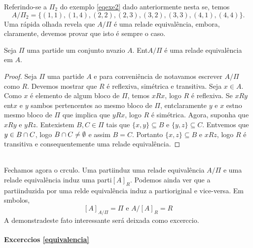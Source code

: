 Referindo-se a $\Pi_2$ do exemplo \ref{eqexe2} dado anteriormente nesta se\caoi, temos
\[
A/\Pi_2=\{(1,1),(1,4),(2,2),(2,3),(3,2),(3,3),(4,1),(4,4)\}.
\]
Uma r\'apida olhada revela que $A/\Pi$ \'e uma rela\cao de equival\^encia, embora, claramente, devemos provar que isto \'e sempre o caso.
\begin{teob}
Seja $\Pi$ uma parti\cao de um conjunto n\ao vazio $A$. Ent\ao $A/\Pi$ \'e uma rela\cao de equival\^encia em $A$.
\end{teob}
\begin{proof}
Seja $\Pi$ uma parti\cao de $A$ e para conveni\^encia de nota\cao vamos escrever $A/\Pi$ como $R$. Devemos mostrar que $R$ \'e reflexiva, sim\'etrica e transitiva. Seja $x\in A$. Como $x$ \'e elemento de algum bloco de $\Pi$, temos $xRx$, logo $R$ \'e reflexiva. Se $xRy$ ent\ao $x$ e $y$ s\ao ambos pertencentes ao mesmo bloco de $\Pi$, ent\ao claramente $y$ e $x$ est\ao no mesmo bloco de $\Pi$ que implica que $yRx$, logo $R$ \'e sim\'etrica. Agora, suponha que $xRy$ e $yRz$. Ent\ao existem $B,C\in\Pi$ tais que $\{x,y\}\subseteq B$ e $\{y,z\}\subseteq C$. Ent\ao vemos que $y\in B\cap C$, logo $B\cap C\neq\emptyset$ e assim $B=C$. Portanto $\{x,z\}\subseteq B$ e $xRz$, logo $R$ \'e transitiva e consequentemente uma rela\cao de equival\^encia. 
\end{proof}
\\

Fechamos agora o c\ih rculo. Uma parti\cao induz uma rela\cao de equival\^encia $A/\Pi$ e uma rela\cao de equival\^encia induz uma parti\cao $[A]_R$. Podemos ainda ver que a parti\cao induzida por uma rel\cao de equival\^encia induz a parti\cao original e vice-versa. Em s\ih mbolos,
\[
[A]_{A/\Pi}=\Pi \textrm{ e } A/[A]_R=R
\]
A demonstra\cao deste fato interessante ser\'a deixada como excerc\ih cio.

\paragraph{Excerc\ih cios \ref{equivalencia}}

